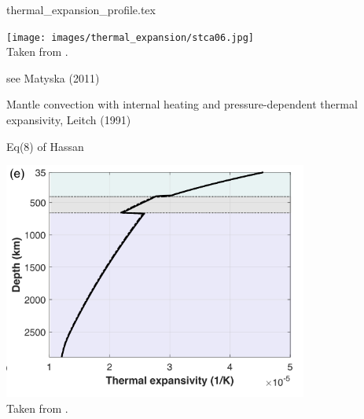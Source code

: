 \begin{flushright} {\tiny {\color{gray} thermal\_expansion\_profile.tex}} \end{flushright}

\begin{center}
\texttt{[image: images/thermal\_expansion/stca06.jpg]}\\
{\captionfont Taken from \textcite{stca06}.}
\end{center}

see Matyska \etal (2011) \cite{mayw11}

Mantle convection with internal heating and pressure-dependent thermal expansivity, Leitch \etal (1991) \cite{leys91}

Eq(8) of Hassan \etal \cite{hafg15}

\begin{center}
\includegraphics[width=10cm]{images/thermal_expansion/nemi23}\\
{\captionfont Taken from \textcite{nemi23}.}
\end{center}
